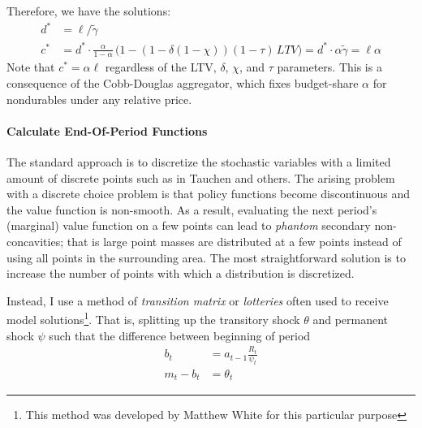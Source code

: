 \documentclass[\econtexMain]{subfiles}
\begin{document}
Therefore, we have the solutions:
\begin{align}
	d^{*} &= \ell / \tilde{\gamma} \\
	c^{*} &= d^{*}\cdot\frac{\alpha}{1-\alpha}\,\bigl(1-(1-\delta(1-\chi))(1-\tau)\,LTV\bigr) = d^{*}\cdot\alpha\tilde{\gamma} = \ell\alpha
\end{align}
Note that $c^* = \alpha\ell$ regardless of the LTV, $\delta$, $\chi$, and $\tau$ parameters. This is a consequence of the Cobb-Douglas aggregator, which fixes budget-share $\alpha$ for nondurables under any relative price.

		
\paragraph{Calculate End-Of-Period Functions}

The standard approach is to discretize the stochastic variables with a limited amount of discrete points such as in Tauchen and others. The arising problem with a discrete choice problem is that policy functions become discontinuous and the value function is non-smooth. As a result, evaluating the next period's (marginal) value function on a few points can lead to \textit{phantom} secondary non-concavities; that is large point masses are distributed at a few points instead of using all points in the surrounding area. The most straightforward solution is to increase the number of points with which a distribution is discretized. 

Instead, I use a method of \textit{transition matrix} or \textit{lotteries} often used to receive model solutions\footnote{This method was developed by Matthew White for this particular purpose}. That is, splitting up the transitory shock $\theta$ and permanent shock $\psi$ such that the difference between beginning of period
\begin{align}
	b_t &= a_{t-1} \frac{R_t}{\psi_t}\\
	m_t - b_t &= \theta_t 
\end{align}
\end{document}
